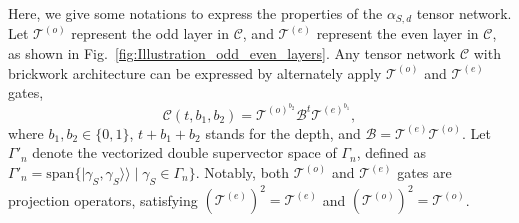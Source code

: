 \documentclass[journal=jctcce,a4paper,manuscript=article]{achemso}
\newcommand{\supket}[1]{|#1 \rangle\rangle}
\newcommand{\Tcal}{\mathcal{T}}
\begin{document}
Here, we give some notations to express the properties of the $\alpha_{S,d}$
tensor network. Let $\Tcal^{(o)}$ represent the odd layer in $\mathcal{C}$, and
$\Tcal^{(e)}$ represent the even layer in $\mathcal{C}$, as shown in
Fig.~\ref{fig:Illustration_odd_even_layers}. Any tensor network $\mathcal{C}$
with brickwork architecture can be expressed by alternately apply $\Tcal^{(o)}$
and $\Tcal^{(e)}$ gates,
\begin{equation}
  \mathcal{C} \left(t, b_1, b_2\right)=\Tcal^{(o)^{b_2}}\mathcal{B}^t \Tcal^{(e)^{b_1}},
\end{equation}
where $b_1, b_2 \in\{0,1\}$, $t+b_1+b_2$ stands for the depth, and $\mathcal{B = }\Tcal^{(e)}\Tcal^{(o)}$.
Let $\Gamma'_n$ denote the vectorized double supervector space of $\Gamma_n$, defined as $\Gamma'_n = \text{span}\{\supket{\gamma_S, \gamma_S} \mid \gamma_S \in \Gamma_n \}$. Notably, both $\Tcal^{(o)}$ and $\Tcal^{(e)}$ gates are projection operators, satisfying $(\Tcal^{(e)})^2 = \Tcal^{(e)}$ and $(\Tcal^{(o)})^2 = \Tcal^{(o)}$.
\end{document}
